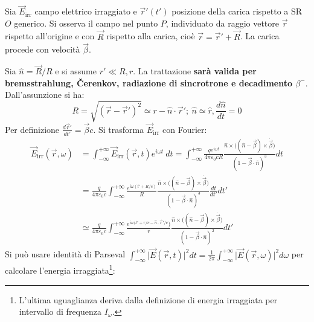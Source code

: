 \documentclass[10pt, a4paper]{scrartcl}
\numberwithin{equation}{subsection}
\theoremstyle{style1}
\begin{document}
Sia $\vec{E}_\text{irr}$ campo elettrico irraggiato e $\vec{r}'(t')$ posizione della carica rispetto a SR $O$ generico. Si osserva il campo nel punto $P$, individuato da raggio vettore $\vec{r}$ rispetto all'origine e con $\vec{R}$ rispetto alla carica, cio\`e $\vec{r}= \vec{r}' + \vec{R}$. La carica procede con velocit\`a $\vec{\beta }$.

Sia $\hat{n} = \vec{R}/R$ e si assume $r' \ll R , r$. La trattazione \textbf{sar\`a valida per bremsstrahlung, \v Cerenkov, radiazione di sincrotrone e decadimento $\beta ^-$}. Dall'assunzione si ha:
\[
R = \sqrt{(\vec{r}-\vec{r}')^2} \simeq r - \hat{n}\cdot \vec{r}'; \ \hat{n} \simeq \hat{r}, \frac{d \hat{n}}{d t} = 0
\] 
Per definizione $\frac{d \vec{r}'}{d t'} = \vec{\beta }c$. Si trasforma $\vec{E}_\text{irr}$ con Fourier:
\begin{equation}
	\begin{split}
		\vec{E}_\text{irr}(\vec{r},\omega)&= \int_{-\infty} ^{+\infty} \vec{E}_{\text{irr}} (\vec{r},t) e^{i\omega t} \ dt =\int_{-\infty} ^{+\infty} \frac{qe^{i\omega t} }{4\pi \varepsilon _0 c R}\frac{\hat{n}\times \big((\hat{n}-\vec{\beta }) \times \dot{ \vec{\beta }}\big)}{(1- \vec{\beta }\cdot \hat{n})^3} dt\\
						  &=\frac{q}{4\pi \varepsilon _0 c} \int_{-\infty} ^{+\infty} \frac{e^{i\omega (t' + R / c)} }{R} \frac{\hat{n}\times \big((\hat{n}-\vec{\beta }) \times \dot{\vec{\beta }}\big)}{(1-\vec{\beta }\cdot \hat{n})^3} \frac{d t}{d t'} dt'\\
						  &\simeq \frac{q}{4\pi \varepsilon _0 c} \int_{-\infty} ^{+\infty}  \frac{e^{i\omega(t' + r / c - \hat{n}\cdot \vec{r}' / c} )}{r} \frac{\hat{n}\times \big((\hat{n}-\vec{\beta }) \times \dot{\vec{\beta }}\big)}{(1-\vec{\beta }\cdot \hat{n})^2}dt'
	\end{split}
\end{equation}
Si pu\`o usare identit\`a di Parseval $\int_{-\infty} ^{+\infty} \lvert \vec{E}(\vec{r},t) \rvert ^2  dt=\frac{1}{2\pi} \int_{-\infty} ^{+\infty} \lvert \vec{E}(\vec{r},\omega) \rvert ^2  d\omega$ per calcolare l'energia irraggiata\footnote{L'ultima uguaglianza deriva dalla definizione di energia irraggiata per intervallo di frequenza $I_\omega$.}:
\end{document}
